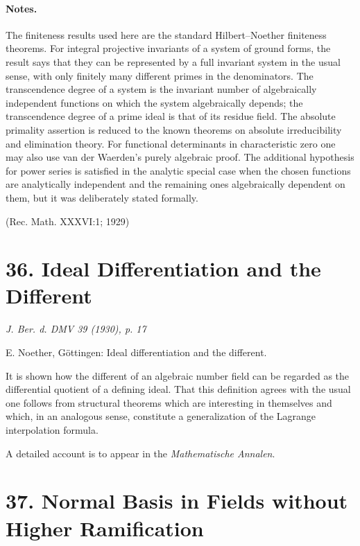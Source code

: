 \documentclass[11pt]{article}
\begin{document}
\paragraph{Notes.}
The finiteness results used here are the standard Hilbert--Noether finiteness theorems. For integral projective invariants of a system of ground forms, the result says that they can be represented by a full invariant system in the usual sense, with only finitely many different primes in the denominators. The transcendence degree of a system is the invariant number of algebraically independent functions on which the system algebraically depends; the transcendence degree of a prime ideal is that of its residue field. The absolute primality assertion is reduced to the known theorems on absolute irreducibility and elimination theory. For functional determinants in characteristic zero one may also use van der Waerden's purely algebraic proof. The additional hypothesis for power series is satisfied in the analytic special case when the chosen functions are analytically independent and the remaining ones algebraically dependent on them, but it was deliberately stated formally.

\begin{center}
(Rec. Math. XXXVI:1; 1929)
\end{center}

\section*{36. Ideal Differentiation and the Different}

\begin{center}
\emph{J. Ber. d. DMV 39 (1930), p. 17}
\end{center}

E. Noether, Göttingen: Ideal differentiation and the different.

It is shown how the different of an algebraic number field can be regarded as the differential quotient of a defining ideal. That this definition agrees with the usual one follows from structural theorems which are interesting in themselves and which, in an analogous sense, constitute a generalization of the Lagrange interpolation formula.

A detailed account is to appear in the \emph{Mathematische Annalen}.

\section*{37. Normal Basis in Fields without Higher Ramification}
\end{document}
